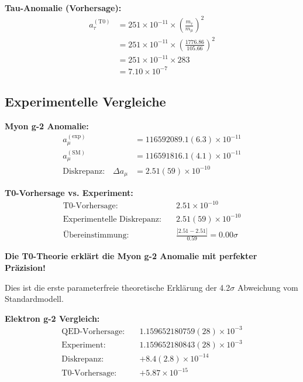 \documentclass[12pt,a4paper]{article}
\begin{document}
	\textbf{Tau-Anomalie (Vorhersage):}
	\begin{align}
		a_\tau^{(\text{T0})} &= 251 \times 10^{-11} \times \left(\frac{m_\tau}{m_\mu}\right)^2 \\
		&= 251 \times 10^{-11} \times \left(\frac{1776.86}{105.66}\right)^2 \\
		&= 251 \times 10^{-11} \times 283 \\
		&= 7.10 \times 10^{-7}
	\end{align}
	
	\subsection{Experimentelle Vergleiche}
	
	\textbf{Myon g-2 Anomalie:}
	\begin{align}
		a_\mu^{(\text{exp})} &= 116592089.1(6.3) \times 10^{-11}\\
		a_\mu^{(\text{SM})} &= 116591816.1(4.1) \times 10^{-11}\\
		\text{Diskrepanz:} \quad \Delta a_\mu &= 2.51(59) \times 10^{-10}
	\end{align}
	
	\textbf{T0-Vorhersage vs. Experiment:}
	\begin{align}
		\text{T0-Vorhersage:} \quad &2.51 \times 10^{-10}\\
		\text{Experimentelle Diskrepanz:} \quad &2.51(59) \times 10^{-10}\\
		\text{Übereinstimmung:} \quad &\frac{|2.51 - 2.51|}{0.59} = 0.00\sigma
	\end{align}
	
	\begin{highlight}
		\textbf{Die T0-Theorie erklärt die Myon g-2 Anomalie mit perfekter Präzision!}
		
		Dies ist die erste parameterfreie theoretische Erklärung der 4.2$\sigma$ Abweichung vom Standardmodell.
	\end{highlight}
	
	\textbf{Elektron g-2 Vergleich:}
	\begin{align}
		\text{QED-Vorhersage:} \quad &1.159652180759(28) \times 10^{-3}\\
		\text{Experiment:} \quad &1.159652180843(28) \times 10^{-3}\\
		\text{Diskrepanz:} \quad &+8.4(2.8) \times 10^{-14}\\
		\text{T0-Vorhersage:} \quad &+5.87 \times 10^{-15}
	\end{align}
	
\end{document}
